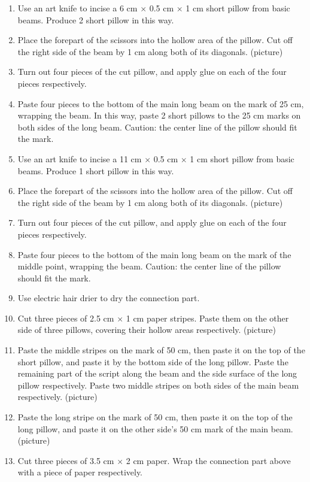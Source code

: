 \begin{enumerate}
\begin{enumerate}
	\item Use an art knife to incise a 6 cm $\times$ 0.5 cm $\times$ 1 cm short pillow from basic beams. Produce 2 short pillow in this way. 
	\item Place the forepart of the scissors into the hollow area of the pillow. Cut off the right side of the beam by 1 cm along both of its diagonals.
	(picture)
	\item Turn out four pieces of the cut pillow, and apply glue on each of the four pieces respectively. 
	\item Paste four pieces to the bottom of the main long beam on the mark of 25 cm, wrapping the beam. In this way, paste 2 short pillows to the 25 cm marks on both sides of the long beam. 
	Caution: the center line of the pillow should fit the mark.
	\item Use an art knife to incise a 11 cm $\times$ 0.5 cm $\times$ 1 cm short pillow from basic beams. Produce 1 short pillow in this way. 
	\item Place the forepart of the scissors into the hollow area of the pillow. Cut off the right side of the beam by 1 cm along both of its diagonals.
	(picture)
	\item Turn out four pieces of the cut pillow, and apply glue on each of the four pieces respectively. 
	\item Paste four pieces to the bottom of the main long beam on the mark of the middle point, wrapping the beam. 
	Caution: the center line of the pillow should fit the mark.
	\item Use electric hair drier to dry the connection part. 
	\item Cut three pieces of 2.5 cm $\times$ 1 cm paper stripes. Paste them on the other side of three pillows, covering their hollow areas respectively.
	(picture)
	\item Paste the middle stripes on the mark of 50 cm, then paste it on the top of the short pillow, and paste it by the bottom side of the long pillow. Paste the remaining part of the script along the beam and the side surface of the long pillow respectively. Paste two middle stripes on both sides of the main beam respectively. 
	(picture)
	\item Paste the long stripe on the mark of 50 cm, then paste it on the top of the long pillow, and paste it on the other side’s 50 cm mark of the main beam.
	(picture)
	\item Cut three pieces of 3.5 cm $\times$ 2 cm paper. Wrap the connection part above with a piece of paper respectively. 

\end{enumerate}
\end{enumerate}
